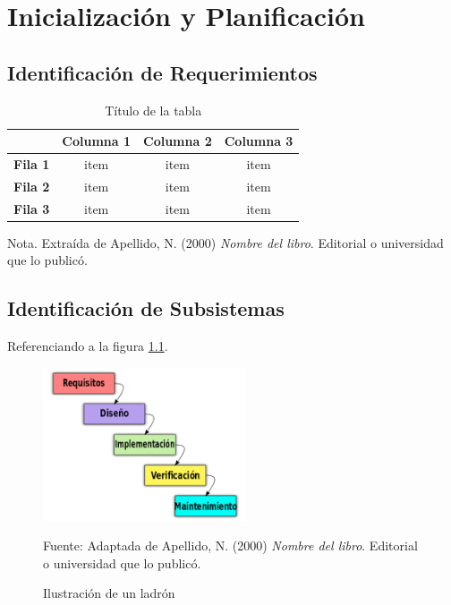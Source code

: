 \chapter{Inicialización y Planificación}

\section{Identificación de Requerimientos}

\begin{table}[H]
    \caption{Título de la tabla}
    \label{tabla:ejemplo}
    \begin{center}
        \begin{tabular}{c|c|c|c|}
            \cline{2-4}
            & \textbf{Columna 1} & \textbf{Columna 2} & \textbf{Columna 3} \\ \hline
            \multicolumn{1}{|c|}{\textbf{Fila 1}} & item               & item               & item               \\ \hline
            \multicolumn{1}{|c|}{\textbf{Fila 2}} & item               & item               & item               \\ \hline
            \multicolumn{1}{|c|}{\textbf{Fila 3}} & item               & item               & item               \\ \hline
        \end{tabular}
    \end{center}
    Nota. Extraída de Apellido, N. (2000) \textit{Nombre del libro}.
    Editorial o universidad que lo publicó.
\end{table}

\section{Identificación de Subsistemas}
Referenciando a la figura \ref{fig:ejemplo}.
\begin{figure}[H]
    \begin{center}
        \includegraphics[width=6cm]{img/capitulo_4/cascada.png}
    \end{center}
    \caption{Ilustración de un ladrón}
    Fuente: Adaptada de Apellido, N. (2000) \textit{Nombre del libro}.
    Editorial o universidad que lo publicó.
    \label{fig:ejemplo}
\end{figure}

